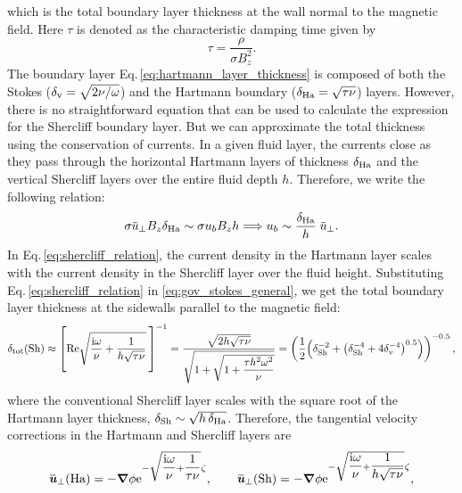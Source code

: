 \documentclass[aps,prfluids,reprint,superscriptaddress]{revtex4-2}
\newcommand{\h}[1]{\textbf{\textit{#1}}}
\newcommand{\ii}[1]{\text{#1}}
\newcommand{\overbar}[1]{\mkern 1.5mu\overline{\mkern-2mu#1\mkern-2mu}\mkern 1.5mu}
\begin{document}
which is the total boundary layer thickness at the wall normal to the magnetic field. Here $\tau$ is denoted as the characteristic damping time given by
\begin{equation}
	\tau  = \frac{\rho}{\sigma B_z^2} .
	\label{eq:damping_time}
\end{equation}
The boundary layer Eq.\,\eqref{eq:hartmann_layer_thickness} is composed of both the Stokes ($\delta_{\rm v} = \sqrt{2\nu/\omega}$) and the Hartmann boundary ($\delta_{\rm Ha}=\sqrt{\tau\nu}$) layers. However, there is no straightforward equation that can be used to calculate the expression for the Shercliff boundary layer. But we can approximate the total thickness using the conservation of currents. In a given fluid layer, the currents close as they pass through the horizontal Hartmann layers of thickness $\delta_{\rm Ha}$ and the vertical Shercliff layers over the entire fluid depth $h$. Therefore, we write the following relation:
\begin{equation}
	\sigma{\overbar{u}}_{\perp} B_z \delta_{\rm Ha} \sim 
	\sigma
	{u}_b B_z h 
	\Longrightarrow 
	{u}_b \sim \frac{\delta_{\rm Ha}}{h} 
	\;{\overbar{u}}_{\perp}.
	\label{eq:shercliff_relation}
\end{equation} 
In Eq.\,\eqref{eq:shercliff_relation}, the current density in the Hartmann layer scales with the current density in the Shercliff layer over the fluid height. Substituting Eq.\,\eqref{eq:shercliff_relation} in \eqref{eq:gov_stokes_general}, we get the total boundary layer thickness at the sidewalls parallel to the magnetic field:
\begin{equation}
	\delta_{\rm tot} (\ii{Sh}) \approx 
	\left[ \rule{0pt}{0.8cm}
	\ii{Re}\sqrt{\dfrac{\ii i\omega}{\nu} + \dfrac{1}{h\sqrt{\tau\nu}}
	}
	\:\right]^{-1}
	=
	\dfrac{\sqrt{2h\sqrt{\tau\nu}}}
	{
		\sqrt{1 + \sqrt{1 + \dfrac{\tau h^2\omega^2}{\nu}}}
	}
	= 
	\left( \frac{1}{2}\Bigl(
	\delta_{\rm Sh}^{-2} + \left( \delta_{\rm Sh}^{-4} + 4\delta_{\rm v}^{-4}\right)^{0.5} \Bigr)
	\right)^{-0.5}
	,
	\label{eq:shercliff_layer_thickness}
\end{equation}
where the conventional Shercliff layer scales with the square root of the Hartmann layer thickness, $\delta_{\rm Sh} \sim \sqrt{h\,\delta_{\rm Ha}}$. Therefore, the tangential velocity corrections in the Hartmann and Shercliff layers are
\begin{equation}
	{\overbar{\h u}}_{\perp} (\ii{Ha})=
	-\bm\nabla \phi 
	\ii e^{-
		\sqrt{\dfrac{\ii i\omega}{\nu} + \dfrac{1}{\tau\nu}
		}
	\zeta
	},
	\qquad
	{\overbar{\h u}}_{\perp} (\ii{Sh})=
	-\bm\nabla \phi 
	\ii e^{- 
		\sqrt{\dfrac{\ii i\omega}{\nu} + \dfrac{1}{h\sqrt{\tau\nu}}
		}
		\zeta
	},
	\label{eq:Ha_Sh_velocities}
\end{equation}
\end{document}

